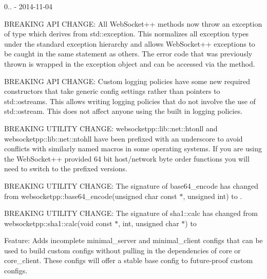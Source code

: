 0.. -\/ 2014-\/11-\/04
\begin{DoxyItemize}
\item BREAKING API CHANGE\+: All Web\+Socket++ methods now throw an exception of type {\ttfamily {}} which derives from {\ttfamily std\+::exception}. This normalizes all exception types under the standard exception hierarchy and allows Web\+Socket++ exceptions to be caught in the same statement as others. The error code that was previously thrown is wrapped in the exception object and can be accessed via the {\ttfamily {}} method.
\item BREAKING API CHANGE\+: Custom logging policies have some new required constructors that take generic config settings rather than pointers to std\+::ostreams. This allows writing logging policies that do not involve the use of std\+::ostream. This does not affect anyone using the built in logging policies.
\item BREAKING UTILITY CHANGE\+: {\ttfamily websocketpp\+::lib\+::net\+::htonll} and {\ttfamily websocketpp\+::lib\+::net\+::ntohll} have been prefixed with an underscore to avoid conflicts with similarly named macros in some operating systems. If you are using the Web\+Socket++ provided 64 bit host/network byte order functions you will need to switch to the prefixed versions.
\item BREAKING UTILITY CHANGE\+: The signature of {\ttfamily base64\+\_\+encode} has changed from {\ttfamily websocketpp\+::base64\+\_\+encode(unsigned char const \texorpdfstring{$\ast$}{*}, unsigned int)} to {\ttfamily {}}.
\item BREAKING UTILITY CHANGE\+: The signature of {\ttfamily sha1\+::calc} has changed from {\ttfamily websocketpp\+::sha1\+::calc(void const \texorpdfstring{$\ast$}{*}, int, unsigned char \texorpdfstring{$\ast$}{*})} to {\ttfamily {}}
\item Feature\+: Adds incomplete {\ttfamily minimal\+\_\+server} and {\ttfamily minimal\+\_\+client} configs that can be used to build custom configs without pulling in the dependencies of {\ttfamily core} or {\ttfamily core\+\_\+client}. These configs will offer a stable base config to future-\/proof custom configs.

\end{DoxyItemize}
